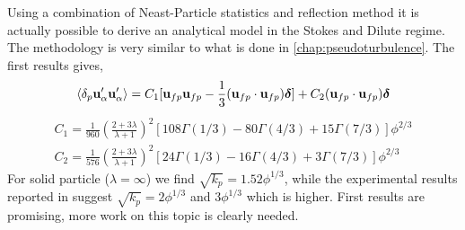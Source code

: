 \begin{enumerate}
    Using a combination of Neast-Particle statistics and reflection method it is actually possible to derive an analytical model in the Stokes and Dilute regime. 
    The methodology is very similar to what is done in \ref{chap:pseudoturbulence}. 
    The first results gives, 
    \begin{equation*}
        \left<\delta_p \textbf{u}_\alpha'\textbf{u}_\alpha'\right>
        = 
        C_1[\textbf{u}_{fp}\textbf{u}_{fp} - \frac{1}{3}(\textbf{u}_{fp}\cdot \textbf{u}_{fp})\bm\delta] 
        + C_2(\textbf{u}_{fp}\cdot \textbf{u}_{fp})\bm\delta
    \end{equation*}
    \begin{align}
      C_1 = \frac{1}{960}\left(\frac{2+3\lambda}{\lambda+1}\right)^2 \left[
        108\Gamma(1/3)
        - 80\Gamma (4/3)
        +15\Gamma(7/3)
      \right]\phi^{2/3}\\
      C_2 = \frac{1}{576}\left(
        \frac{2+3\lambda}{\lambda+1}\right)^2 \left[
        24\Gamma(1/3)
        - 16\Gamma (4/3)
        +3\Gamma(7/3)
      \right]\phi^{2/3}
    \end{align}
    For solid particle ($\lambda=\infty$) we find $\sqrt{k_p} = 1.52\phi^{1/3}$, while the experimental results reported in \citet{guazzelli2011fluctuations} suggest $\sqrt{k_p} = 2\phi^{1/3}$ and $3\phi^{1/3}$ which is higher. 
    First results are promising, more work on this topic is clearly needed.
\end{enumerate}

